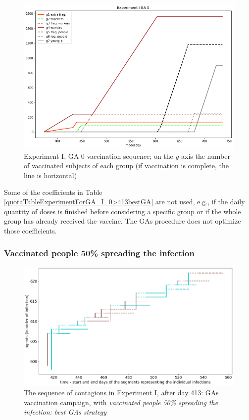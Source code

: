 \documentclass[graybox]{svmult}
\begin{document}
\begin{figure}[t]
\center
\includegraphics[scale=0.45]{Experiment_I_GA_0_VaccinationSequence.png} %

\caption{Experiment I, GA 0 vaccination sequence; on the $y$ axis the number of vaccinated subjects of each group (if vaccination is complete, the line is horizontal)} 
\label{Experiment_I_GA0VaccinationSequence}
\end{figure}

Some of the coefficients in Table \ref{quotaTableExperimentForGA_I_0>413bestGA} are not used, e.g., if the daily quantity of doses is finished before considering a specific group or if the whole group has already received the vaccine. The GAs procedure does not optimize those coefficients.


\subsubsection{Vaccinated people 50\% spreading the infection}

\begin{figure}[t]
\center
\includegraphics[scale=0.3]{ExperimentForGA_I_05>413bestGA.png}

\caption{The sequence of contagions in Experiment I, after day 413: GAs vaccination campaign, with \emph{vaccinated people 50\% spreading the infection: best GAs strategy}}
\label{ExperimentForGA_I_05>413bestGA}
\end{figure}
\end{document}
